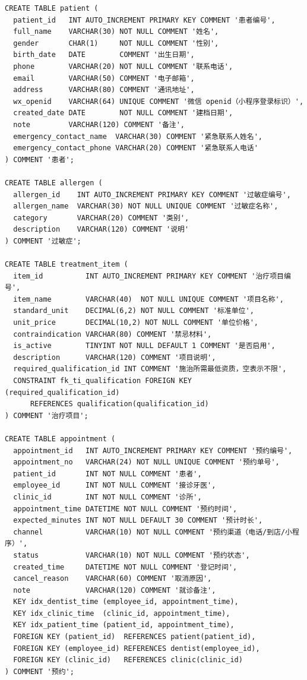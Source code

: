 \documentclass[11pt,a4paper]{ctexart}
\begin{document}
\begin{lstlisting}[style=sql]
CREATE TABLE patient (
  patient_id   INT AUTO_INCREMENT PRIMARY KEY COMMENT '患者编号',
  full_name    VARCHAR(30) NOT NULL COMMENT '姓名',
  gender       CHAR(1)     NOT NULL COMMENT '性别',
  birth_date   DATE        COMMENT '出生日期',
  phone        VARCHAR(20) NOT NULL COMMENT '联系电话',
  email        VARCHAR(50) COMMENT '电子邮箱',
  address      VARCHAR(80) COMMENT '通讯地址',
  wx_openid    VARCHAR(64) UNIQUE COMMENT '微信 openid（小程序登录标识）',
  created_date DATE        NOT NULL COMMENT '建档日期',
  note         VARCHAR(120) COMMENT '备注',
  emergency_contact_name  VARCHAR(30) COMMENT '紧急联系人姓名',
  emergency_contact_phone VARCHAR(20) COMMENT '紧急联系人电话'
) COMMENT '患者';

CREATE TABLE allergen (
  allergen_id    INT AUTO_INCREMENT PRIMARY KEY COMMENT '过敏症编号',
  allergen_name  VARCHAR(30) NOT NULL UNIQUE COMMENT '过敏症名称',
  category       VARCHAR(20) COMMENT '类别',
  description    VARCHAR(120) COMMENT '说明'
) COMMENT '过敏症';

CREATE TABLE treatment_item (
  item_id          INT AUTO_INCREMENT PRIMARY KEY COMMENT '治疗项目编号',
  item_name        VARCHAR(40)  NOT NULL UNIQUE COMMENT '项目名称',
  standard_unit    DECIMAL(6,2) NOT NULL COMMENT '标准单位',
  unit_price       DECIMAL(10,2) NOT NULL COMMENT '单位价格',
  contraindication VARCHAR(80) COMMENT '禁忌材料',
  is_active        TINYINT NOT NULL DEFAULT 1 COMMENT '是否启用',
  description      VARCHAR(120) COMMENT '项目说明',
  required_qualification_id INT COMMENT '施治所需最低资质，空表示不限',
  CONSTRAINT fk_ti_qualification FOREIGN KEY (required_qualification_id)
      REFERENCES qualification(qualification_id)
) COMMENT '治疗项目';

CREATE TABLE appointment (
  appointment_id   INT AUTO_INCREMENT PRIMARY KEY COMMENT '预约编号',
  appointment_no   VARCHAR(24) NOT NULL UNIQUE COMMENT '预约单号',
  patient_id       INT NOT NULL COMMENT '患者',
  employee_id      INT NOT NULL COMMENT '接诊牙医',
  clinic_id        INT NOT NULL COMMENT '诊所',
  appointment_time DATETIME NOT NULL COMMENT '预约时间',
  expected_minutes INT NOT NULL DEFAULT 30 COMMENT '预计时长',
  channel          VARCHAR(10) NOT NULL COMMENT '预约渠道（电话/到店/小程序）',
  status           VARCHAR(10) NOT NULL COMMENT '预约状态',
  created_time     DATETIME NOT NULL COMMENT '登记时间',
  cancel_reason    VARCHAR(60) COMMENT '取消原因',
  note             VARCHAR(120) COMMENT '就诊备注',
  KEY idx_dentist_time (employee_id, appointment_time),
  KEY idx_clinic_time  (clinic_id, appointment_time),
  KEY idx_patient_time (patient_id, appointment_time),
  FOREIGN KEY (patient_id)  REFERENCES patient(patient_id),
  FOREIGN KEY (employee_id) REFERENCES dentist(employee_id),
  FOREIGN KEY (clinic_id)   REFERENCES clinic(clinic_id)
) COMMENT '预约';


\end{lstlisting}
\end{document}
